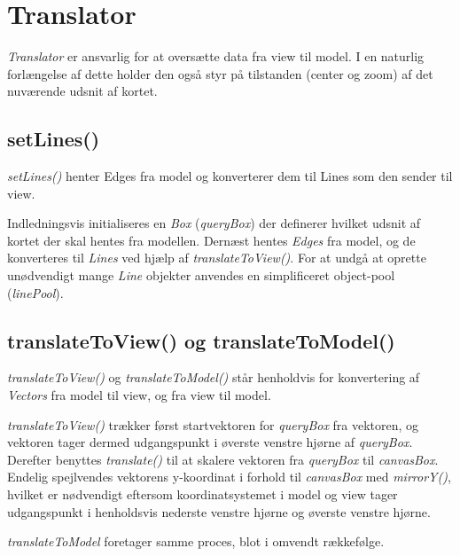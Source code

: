 \section{Translator}

\emph{Translator} er ansvarlig for at oversætte data fra view til model. I en naturlig forlængelse af dette holder den også styr på tilstanden (center og zoom) af det nuværende udsnit af kortet.

\subsection{setLines()}

\emph{setLines()} henter Edges fra model og konverterer dem til Lines som den sender til view.

Indledningsvis initialiseres en \emph{Box} (\emph{queryBox}) der definerer hvilket udsnit af kortet der skal hentes fra modellen. Dernæst hentes \emph{Edges} fra model, og de konverteres til \emph{Lines} ved hjælp af \emph{translateToView()}. For at undgå at oprette unødvendigt mange \emph{Line} objekter anvendes en simplificeret object-pool (\emph{linePool}).

\subsection{translateToView() og translateToModel()}

\emph{translateToView()} og \emph{translateToModel()} står henholdvis for konvertering af \emph{Vectors} fra model til view, og fra view til model.

\emph{translateToView()} trækker først startvektoren for \emph{queryBox} fra vektoren, og vektoren tager dermed udgangspunkt i øverste venstre hjørne af \emph{queryBox}. Derefter benyttes \emph{translate()} til at skalere vektoren fra \emph{queryBox} til \emph{canvasBox}. Endelig spejlvendes vektorens y-koordinat i forhold til \emph{canvasBox} med \emph{mirrorY()}, hvilket er nødvendigt eftersom koordinatsystemet i model og view tager udgangspunkt i henholdsvis nederste venstre hjørne og øverste venstre hjørne.

\emph{translateToModel} foretager samme proces, blot i omvendt rækkefølge.
